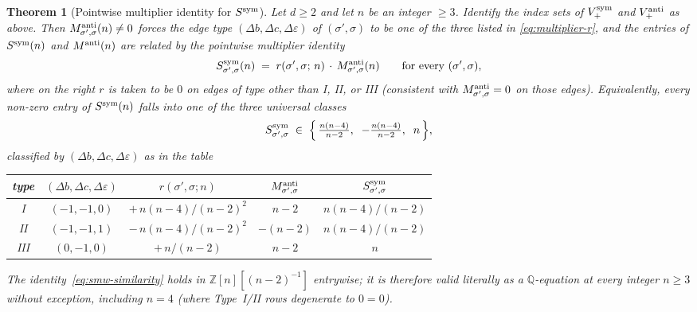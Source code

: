 \documentclass{amsart}
\newtheorem{theorem}{Theorem}[section]
\theoremstyle{definition}
\theoremstyle{remark}
\begin{document}
\begin{theorem}[Pointwise multiplier identity for $S^{\rm sym}$]
\label{thm:smw-similarity}
Let $d \ge 2$ and let $n$ be an integer $\ge 3$.  Identify the
index sets of $V_+^{\rm sym}$ and $V_+^{\rm anti}$ as above.
Then $M^{\rm anti}_{\sigma',\sigma}(n) \neq 0$ forces the edge
type $(\Delta b, \Delta c, \Delta\varepsilon)$ of
$(\sigma', \sigma)$ to be one of the three listed in
\eqref{eq:multiplier-r}, and the entries of $S^{\rm sym}(n)$
and $M^{\rm anti}(n)$ are related by the pointwise
multiplier identity
\begin{equation}\label{eq:smw-similarity}
  S^{\rm sym}_{\sigma',\sigma}(n)
  \;=\; r(\sigma', \sigma;\, n)\,\cdot\,
        M^{\rm anti}_{\sigma',\sigma}(n)
  \qquad \text{for every } (\sigma', \sigma),
\end{equation}
where on the right $r$ is taken to be $0$ on edges of type other
than I, II, or III \textup{(}consistent with
$M^{\rm anti}_{\sigma',\sigma} = 0$ on those edges\textup{)}.
Equivalently, every non-zero entry of $S^{\rm sym}(n)$ falls
into one of the three universal classes
\[
  S^{\rm sym}_{\sigma',\sigma}
  \;\in\;
  \Bigl\{\,
        \tfrac{n(n-4)}{n-2},\;\;
       -\tfrac{n(n-4)}{n-2},\;\;
        n
  \,\Bigr\},
\]
classified by $(\Delta b, \Delta c, \Delta\varepsilon)$ as in
the table
\begin{center}\renewcommand{\arraystretch}{1.15}
\begin{tabular}{c@{\quad}c@{\quad}c@{\quad}c@{\quad}c}
\toprule
type & $(\Delta b, \Delta c, \Delta\varepsilon)$
     & $r(\sigma',\sigma;n)$
     & $M^{\rm anti}_{\sigma',\sigma}$
     & $S^{\rm sym}_{\sigma',\sigma}$ \\
\midrule
I   & $(-1, -1, 0)$ & $+\,n(n-4)/(n-2)^2$ & $n - 2$  & $n(n-4)/(n-2)$ \\
II  & $(-1, -1, 1)$ & $-\,n(n-4)/(n-2)^2$ & $-(n-2)$ & $n(n-4)/(n-2)$ \\
III & $(0,  -1, 0)$ & $+\,n/(n-2)$        & $n - 2$  & $n$ \\
\bottomrule
\end{tabular}
\end{center}
The identity~\eqref{eq:smw-similarity} holds in
$\mathbb Z[n][(n-2)^{-1}]$ entrywise; it is therefore valid
literally as a $\mathbb Q$-equation at every integer $n \ge 3$
\emph{without exception}, including $n = 4$
\textup{(}where Type~I/II rows degenerate to $0 = 0$\textup{)}.
\end{theorem}
\end{document}
